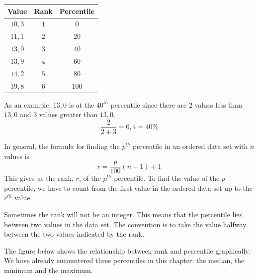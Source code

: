   \begin{center}
    \begin{tabular}{|c|c|c|} \hline

      \textbf{Value} & \textbf{Rank} & \textbf{Percentile} \\\hline

      $10,3$  & $1$    & $0$ \\\hline
      $11,1$  & $2$    & $20$ \\\hline
      $13,0$  & $3$    & $40$ \\\hline
      $13,9$  & $4$    & $60$ \\\hline
      $14,2$  & $5$    & $80$ \\\hline
      $19,8$  & $6$    & $100$ \\\hline

    \end{tabular}
  \end{center}

 As an example, $13,0$ is at the $40^{th}$ percentile since there are
  $2$ values less than $13,0$ and $3$ values greater than $13,0$.
  \begin{equation*}
    \frac{2}{2+3} = 0,4 = 40\%
  \end{equation*}

In general, the formula for finding the $p^{th}$ percentile in an ordered
data set with $n$ values is
\begin{equation*}
  r = \frac{p}{100}\left(n-1\right)+1
\end{equation*}
This gives us the rank, $r$, of the $p^{th}$ percentile. To find the
value of the $p$ percentile, we have to count from the first value in
the ordered data set up to the $r^{th}$ value.

Sometimes the rank will not be an integer. This means that the
percentile lies between two values in the data set. The convention is
to take the value halfway between the two values indicated by the
rank.

The figure below shows the relationship between rank and percentile
graphically. We have already encountered three percentiles in this
chapter: the median, the minimum and the maximum.

\begin{center}
\end{center}

